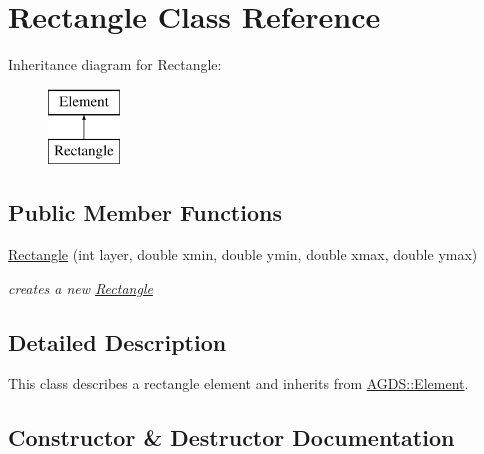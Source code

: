 \hypertarget{class_a_g_d_s_1_1_rectangle}{}\section{Rectangle Class Reference}
\label{class_a_g_d_s_1_1_rectangle}
Inheritance diagram for Rectangle\+:\begin{figure}[H]
\begin{center}
\leavevmode
\includegraphics[height=2.000000cm]{class_a_g_d_s_1_1_rectangle}
\end{center}
\end{figure}
\subsection*{Public Member Functions}
\begin{DoxyCompactItemize}
\item 
\mbox{\hyperlink{class_a_g_d_s_1_1_rectangle_a84899edb51e65c78535f0b06b266f11b}{Rectangle}} (int layer, double xmin, double ymin, double xmax, double ymax)
\begin{DoxyCompactList}\small\item\em creates a new \mbox{\hyperlink{class_a_g_d_s_1_1_rectangle}{Rectangle}} \end{DoxyCompactList}\end{DoxyCompactItemize}


\subsection{Detailed Description}
This class describes a rectangle element and inherits from \mbox{\hyperlink{class_a_g_d_s_1_1_element}{A\+G\+D\+S\+::\+Element}}. 

\subsection{Constructor \& Destructor Documentation}
\mbox{\label{class_a_g_d_s_1_1_rectangle_a84899edb51e65c78535f0b06b266f11b}} 
